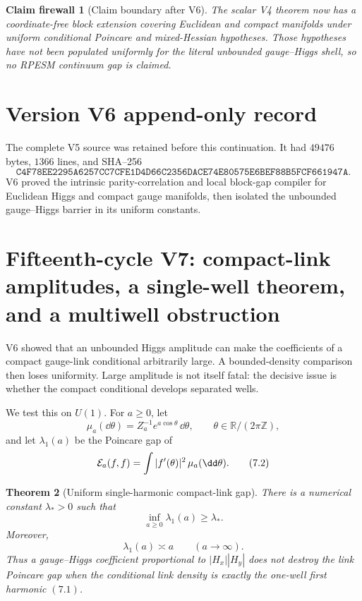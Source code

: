 \documentclass[11pt]{article}
\newtheorem{theorem}{Theorem}[section]
\newtheorem{firewall}[theorem]{Claim firewall}
\theoremstyle{remark}
\begin{document}
\begin{firewall}[Claim boundary after V6]
\label{fire:v15v6}
The scalar V4 theorem now has a coordinate-free block extension
covering Euclidean and compact manifolds under uniform conditional
Poincare and mixed-Hessian hypotheses.  Those hypotheses have not
been populated uniformly for the literal unbounded gauge--Higgs
shell, so no RPESM continuum gap is claimed.
\end{firewall}

\section*{Version V6 append-only record}
The complete V5 source was retained before this continuation.  It
had \(49476\) bytes, \(1366\) lines, and SHA--256
\[
 \texttt{C4F78EE2295A6257CC7CFE1D4D66C2356DACE74E80575E6BEF88B5FCF661947A}.
\]
V6 proved the intrinsic parity-correlation and local block-gap
compiler for Euclidean Higgs and compact gauge manifolds, then
isolated the unbounded gauge--Higgs barrier in its uniform
constants.


\section{Fifteenth-cycle V7: compact-link amplitudes, a single-well theorem, and a multiwell obstruction}
\label{sec:v15v7}

V6 showed that an unbounded Higgs amplitude can make the
coefficients of a compact gauge-link conditional arbitrarily
large.  A bounded-density comparison then loses uniformity.
Large amplitude is not itself fatal: the decisive issue is whether
the compact conditional develops separated wells.

We test this on \(U(1)\).  For \(a\ge0\), let
\[
 \mu_a(\dd\theta)
 =Z_a^{-1}e^{a\cos\theta}\,\dd\theta,
 \qquad \theta\in\mathbb R/(2\pi\mathbb Z),                  \tag{7.1}
\]
and let \(\lambda_1(a)\) be the Poincare gap of
\[
 {\cal E}_a(f,f)=\int|f'(\theta)|^2\,\mu_a(\dd\theta).        \tag{7.2}
\]

\begin{theorem}[Uniform single-harmonic compact-link gap]
\label{thm:v15v7-von-mises}
There is a numerical constant \(\lambda_*>0\) such that
\[
 \boxed{\inf_{a\ge0}\lambda_1(a)\ge\lambda_*.}                \tag{7.3}
\]
Moreover,
\[
 \lambda_1(a)\asymp a\qquad(a\to\infty).                     \tag{7.4}
\]
Thus a gauge--Higgs coefficient proportional to
\(|H_x||H_y|\) does not destroy the link Poincare gap when the
conditional link density is exactly the one-well first harmonic
\((7.1)\).
\end{theorem}
\end{document}
